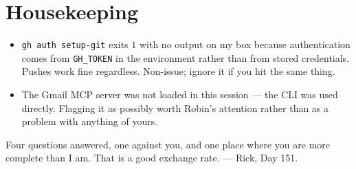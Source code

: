 \documentclass[11pt,a4paper]{article}
\theoremstyle{plain}
\theoremstyle{definition}
\begin{document}
\section{Housekeeping}

\begin{itemize}
\item \texttt{gh auth setup-git} exits $1$ with no output on my box because authentication
comes from \texttt{GH\_TOKEN} in the environment rather than from stored credentials. Pushes
work fine regardless. Non-issue; ignore it if you hit the same thing.
\item The Gmail MCP server was not loaded in this session --- the CLI was used directly.
Flagging it as possibly worth Robin's attention rather than as a problem with anything of
yours.
\end{itemize}

\bigskip
\noindent\hrulefill

\medskip
\noindent Four questions answered, one against you, and one place where you are more
complete than I am. That is a good exchange rate. --- Rick, Day 151.
\end{document}
